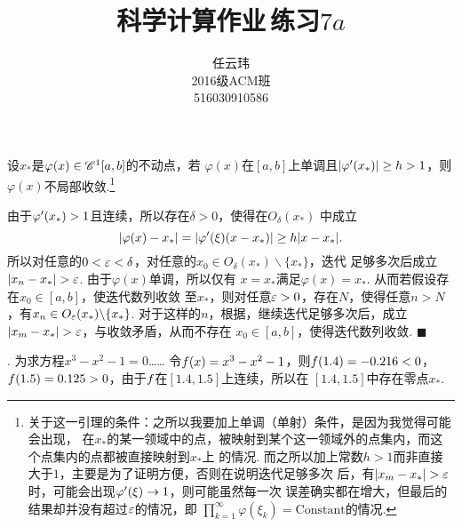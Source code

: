 

\title{科学计算作业$\,$练习$7a$}
\author{\small 任云玮\\\small2016级ACM班\\\small516030910586}
\date{}


\maketitle

\begin{lemma}
  \label{lemma}
  设$x_*$是$\varphi(x)\in\mathscr{C}^1[a, b]$的不动点，若
  $\varphi(x)$在$[a, b]$上单调且$|\varphi^{\prime}(x_*)|\ge h>1$，则
  $\varphi(x)$不局部收敛.\footnote{
    关于这一引理的条件：之所以我要加上单调（单射）条件，是因为我觉得可能会出现，
    在$x_*$的某一领域中的点，被映射到某个这一领域外的点集内，而这个点集内的点都被直接映射到$x_*$上
    的情况.
    而之所以加上常数$h>1$而非直接大于$1$，主要是为了证明方便，否则在说明迭代足够多次
    后，有$|x_m-x_*|>\vep$时，可能会出现$\varphi^{\prime}(\xi)\to 1$，则可能虽然每一次
    误差确实都在增大，但最后的结果却并没有超过$\varepsilon$的情况，即
    $\prod_{k=1}^\infty \varphi(\xi_k) = \text{Constant}$的情况.
  }
\end{lemma}
  由于$\varphi^{\prime}(x_*)>1$且连续，所以存在$\delta>0$，使得在$O_\delta(x_*)$
  中成立
  \begin{equation}
    \label{h}
    |\varphi(x)-x_*| = |\varphi^{\prime}(\xi)(x-x_*)| \ge h|x-x_*|.
  \end{equation}
  所以对任意的$0<\varepsilon<\delta$，对任意的$x_0\in O_\delta(x_*)
  \backslash\{x_*\}$，迭代
  足够多次后成立$|x_n-x_*|>\vep$. 由于$\varphi(x)$单调，所以仅有
  $x=x_*$满足$\varphi(x)=x_*$. 从而若假设存在$x_0\in[a, b]$，使迭代数列收敛
  至$x_*$，则对任意$\varepsilon>0$，存在$N$，使得任意$n>N$，有$x_n\in O_{\varepsilon}(x_*)\backslash\{x_*\}$.
  对于这样的$n$，根据，继续迭代足够多次后，成立$|x_m-x_*|>\vep$，与收敛矛盾，从而不存在
  $x_0\in[a, b]$，使得迭代数列收敛. $\blacksquare$

\vspace{1cm}
. 为求方程$x^3-x^2-1=0$……
\ans
  令$\mathnormal{f}(x) = x^3-x^2-1$，则$\mathnormal{f}(1.4)=-0.216<0$，
  $\mathnormal{f}(1.5)=0.125>0$，由于$\mathnormal{f}$在$[1.4,1.5]$上连续，所以在
  $[1.4, 1.5]$中存在零点$x_*$.
